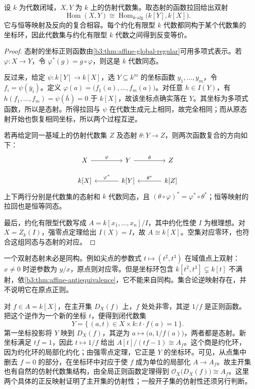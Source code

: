 \begin{theorem}\label{b3:thm:affine-antiequivalence}
	设 \(k\) 为代数闭域，\(X,Y\) 为 \(k\) 上的仿射代数集。取态射的函数拉回给出双射
	\[
		\operatorname{Hom}(X,Y)\cong \operatorname{Hom}_{k\text{-}\mathrm{alg}}\bigl(k[Y],k[X]\bigr).
	\]
	它与恒等映射及反向的复合相容。每个约化有限型 \(k\) 代数都同构于某个代数集的坐标环，因此代数集与约化有限型 \(k\) 代数之间得到反变等价。
\end{theorem}
\begin{proof}
	态射的坐标正则函数由\cref{b3:thm:affine-global-regular}可用多项式表示。若 \(\varphi:X\to Y\)，令 \(\varphi^*(g)=g\circ\varphi\)，则这是 \(k\) 代数同态。

	反过来，给定 \(\psi:k[Y]\to k[X]\)，选 \(Y\subseteq k^m\) 的坐标函数 \(y_1,\ldots,y_m\)，令 \(f_i=\psi(\bar y_i)\)。定义 \(\varphi(a)=\bigl(f_1(a),\ldots,f_m(a)\bigr)\)。对任意 \(h\in I(Y)\)，有 \(h(f_1,\ldots,f_m)=\psi(\bar h)=0\) 于 \(k[X]\)，故该坐标点确实落在 \(Y\)。其坐标为多项式函数，所以是态射。所得拉回与 \(\psi\) 在代数生成元上相同，故完全相同；而从原态射开始也恢复相同坐标，所以两个过程互逆。

	若再给定同一基域上的仿射代数集 \(Z\) 及态射 \(\theta:Y\rightarrow Z\)，则两次函数复合的方向如下：
	\[
		\begin{tikzcd}[column sep=3.5em,row sep=1.5em]
			X\arrow[r,"\varphi"] & Y\arrow[r,"\theta"] & Z \\
			k[X] & k[Y]\arrow[l,"\varphi^*"'] & k[Z]\arrow[l,"\theta^*"']
		\end{tikzcd}
	\]
	上下两行分别是代数集的态射和 \(k\) 代数同态，且 \((\theta\circ\varphi)^*=\varphi^*\circ\theta^*\)；恒等映射的拉回也是恒等同态。

	最后，约化有限型代数写成 \(A=k[x_1,\ldots,x_n]/I\)，其中约化性使 \(I\) 为根理想。对 \(X=Z_k(I)\)，强零点定理给出 \(I(X)=I\)，故 \(A\cong k[X]\)。空集对应零环，也符合这组同态与态射的对应。
\end{proof}

一个双射态射未必是同构。例如尖点的参数式 \(t\mapsto(t^2,t^3)\) 在域值点上双射：\(x\ne0\) 时逆参数为 \(y/x\)，原点则对应零。但是坐标环包含 \(k[t^2,t^3]\subsetneq k[t]\) 不满射，依\cref{b3:thm:affine-antiequivalence}，它不能来自同构。集合论逆映射存在，并不说明它在原点正则。

\ProseParagraphBreak
对 \(f\in A=k[X]\)，在主开集 \(D_X(f)\) 上，\(f\) 处处非零，其逆 \(1/f\) 是正则函数。把这个逆作为一个新的坐标 \(t\)，便得到闭代数集
\[
	Y=\bigl\{\,(a,t)\in X\times k:t\cdot f(a)=1\,\bigr\}.
\]
第一坐标投影将 \(Y\) 映到 \(D_X(f)\)，其逆为 \(a\mapsto\bigl(a,1/f(a)\bigr)\)，两者都是态射。新坐标满足 \(tf=1\)，因此 \(t\mapsto1/f\) 给出 \(A[t]/(tf-1)\cong A_f\)。这个商是约化环，因为约化环的局部化约化；由强零点定理，它正是 \(Y\) 的坐标环。可见，从点集中删去 \(f=0\) 的部分，在坐标环中对应于使 \(f\) 成为单位的局部化 \(A\to A_f\)。故主开集也有自然的仿射代数集结构，由全局正则函数定理得到 \(\mathcal O_X\bigl(D_X(f)\bigr)\cong A_f\)。这里两个具体的正反映射证明了主开集的仿射性；一般开子集的仿射性还须另行判断。
